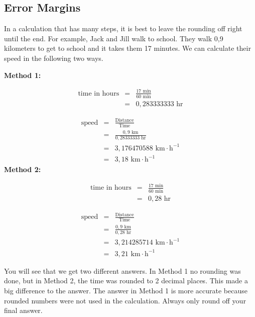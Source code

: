             \subsection*{Error Margins}
            \nopagebreak
        \label{m30853*id64160}In a calculation that has many steps, it is best to leave the rounding off right until the end.
For example, Jack and Jill walk to school. They walk 0,9 kilometers to get to school and it takes them 17 minutes. We can calculate their speed in the following two ways.\par 
        \label{m30853*id64166}\textbf{Method 1:}
          \label{m30853*id64177}\nopagebreak\noindent{}
            
    \begin{eqnarray*}
  \text{time in hours}& =& \frac{17\text{ min}}{60\text{ min}}\\ 
& =& 0,283333333\text{ hr}
      \end{eqnarray*}
\label{m30853*id64327}\nopagebreak\noindent{}
            
    \begin{eqnarray*}
\text{speed} & = & \frac{\text{Distance}}{\text{Time}} \\ 
& = & \frac{0,9\text{ km}}{0,28333333\text{ hr}} \\ 
& = & 3,176470588 \text{ km} \cdot \text{h}^{-1} \\ 
& = & 3,18 \text{ km} \cdot \text{h}^{-1} 
      \end{eqnarray*}
          \textbf{Method 2:}
          \label{m30853*id64256}\nopagebreak\noindent{}
            
    \begin{eqnarray*}
\text{time in hours} & = & \frac{17\text{ min}}{60\text{ min}} \\ 
& = & 0,28\text{ hr}
      \end{eqnarray*}
          \label{m30853*id64461}\nopagebreak\noindent{}
            
    \begin{eqnarray*}
 \text{speed} & = & \frac{\text{Distance}}{\text{Time}} \\  
& = & \frac{0,9\text{ km}}{0,28\text{ hr}} \\ 
& = & 3,214285714 \text{ km} \cdot \text{h}^{-1} \\ 
& = & 3,21 \text{ km} \cdot \text{h}^{-1} 
      \end{eqnarray*}
        \par 
        \label{m30853*id64591}You will see that we get two different answers. In Method 1 no rounding was done, but in Method 2, the time was rounded to 2 decimal places. This made a big difference to the answer. The answer in Method 1 is more accurate because rounded numbers were not used in the calculation. Always only round off your final answer.\par 
      \label{m30853*uid18}
